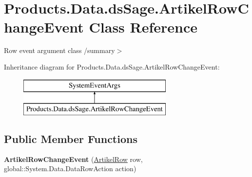\hypertarget{class_products_1_1_data_1_1ds_sage_1_1_artikel_row_change_event}{}\section{Products.\+Data.\+ds\+Sage.\+Artikel\+Row\+Change\+Event Class Reference}
\label{class_products_1_1_data_1_1ds_sage_1_1_artikel_row_change_event}


Row event argument class /summary$>$  


Inheritance diagram for Products.\+Data.\+ds\+Sage.\+Artikel\+Row\+Change\+Event\+:\begin{figure}[H]
\begin{center}
\leavevmode
\includegraphics[height=2.000000cm]{class_products_1_1_data_1_1ds_sage_1_1_artikel_row_change_event}
\end{center}
\end{figure}
\subsection*{Public Member Functions}
\begin{DoxyCompactItemize}
\item 
{\bfseries Artikel\+Row\+Change\+Event} (\hyperlink{class_products_1_1_data_1_1ds_sage_1_1_artikel_row}{Artikel\+Row} row, global\+::\+System.\+Data.\+Data\+Row\+Action action)\hypertarget{class_products_1_1_data_1_1ds_sage_1_1_artikel_row_change_event_a5dde9345eb81969c45b7604f04deb8cb}{}\label{class_products_1_1_data_1_1ds_sage_1_1_artikel_row_change_event_a5dde9345eb81969c45b7604f04deb8cb}

\end{DoxyCompactItemize}
